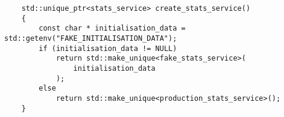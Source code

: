 \begin{verbatim}    
    std::unique_ptr<stats_service> create_stats_service()
    {
        const char * initialisation_data = std::getenv("FAKE_INITIALISATION_DATA");
        if (initialisation_data != NULL)
            return std::make_unique<fake_stats_service>(
                initialisation_data
            );
        else
            return std::make_unique<production_stats_service>();
    }
\end{verbatim}
